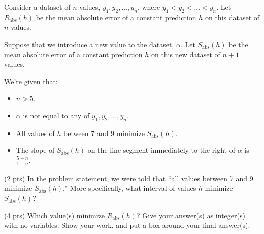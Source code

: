 \documentclass[twoside,12pt]{article}
\begin{document}
\begin{probset}
\begin{prob}[(11 pts)]
\begin{subprobset}
\begin{subprob}



    
\end{subprob}
    
\end{subprobset}
    
\end{prob}

\newpage

\begin{prob}[(12 pts)]

Consider a dataset of $n$ values, $y_1, y_2, ..., y_n$, where $y_1 < y_2 < ... < y_n$. Let $R_\text{abs}(h)$ be the mean absolute error of a constant prediction $h$ on this dataset of $n$ values.

Suppose that we introduce a new value to the dataset, $\alpha$. Let $S_\text{abs}(h)$ be the mean absolute error of a constant prediction $h$ on this new dataset of $n + 1$ values.

We're given that:

\begin{itemize}
    \item $n > 5$.
    \item $\alpha$ is not equal to any of $y_1, y_2, ..., y_n$. 
    \item All values of $h$ between 7 and 9 minimize $S_\text{abs}(h)$.
    \item The slope of $S_\text{abs}(h)$ on the line segment immediately to the right of $\alpha$ is $\frac{5-n}{1 + n}$.
\end{itemize}

\begin{subprobset}

\begin{subprob}(2 pts) In the problem statement, we were told that ``all values between 7 and 9 minimize $S_\text{abs}(h)$." More specifically, what interval of values $h$ minimize $S_\text{abs}(h)$? 

   

    
\end{subprob}

\begin{subprob}(4 pts) Which value(s) minimize $R_\text{abs}(h)$? Give your answer(s) as integer(s) with no variables. Show your work, and put a $\boxed{\text{box}}$ around your final answer(s).


\end{subprob}
\end{subprobset}
\end{prob}
\end{probset}
\end{document}
